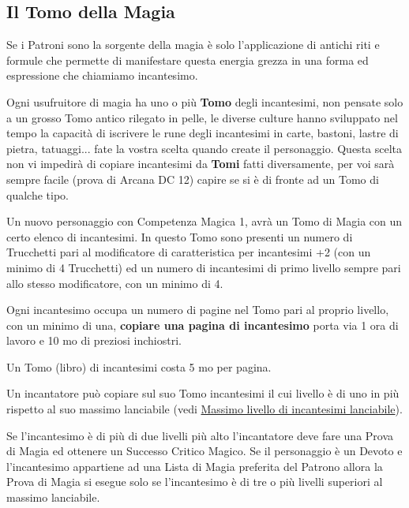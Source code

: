 \begin{multicols}{2}
\subsection{Il Tomo della Magia}\label{magietomodellamagia}

Se i Patroni sono la sorgente della magia è solo l'applicazione di antichi riti e formule che permette di manifestare questa energia grezza in una forma ed espressione che chiamiamo incantesimo.

Ogni usufruitore di magia ha uno o più \textbf{Tomo} degli incantesimi, non pensate solo a un grosso Tomo antico rilegato in pelle, le diverse culture hanno sviluppato nel tempo la capacità di iscrivere le rune degli incantesimi in carte, bastoni, lastre di pietra, tatuaggi... fate la vostra scelta quando create il personaggio.
Questa scelta non vi impedirà di copiare incantesimi da \textbf{Tomi} fatti diversamente, per voi sarà sempre facile (prova di Arcana DC 12) capire se si è di fronte ad un Tomo di qualche tipo.

Un nuovo personaggio con Competenza Magica 1, avrà un Tomo di Magia con un certo elenco di incantesimi. In questo Tomo sono presenti un numero di Trucchetti pari al modificatore di caratteristica per incantesimi +2 (con un minimo di 4 Trucchetti) ed un numero di incantesimi di primo livello sempre pari allo stesso modificatore, con un minimo di 4.\label{tomocm1}\hypertarget{tomocm1}{}

Ogni incantesimo occupa un numero di pagine nel Tomo pari al proprio livello, con un minimo di una, \textbf{copiare una pagina di incantesimo} porta via 1 ora di lavoro e 10 mo di preziosi inchiostri.

Un Tomo (libro) di incantesimi costa 5 mo per pagina.

Un incantatore può copiare sul suo Tomo incantesimi il cui livello è di uno in più rispetto al suo massimo lanciabile (vedi \hyperlink{scuoleelivelli}{Massimo livello di incantesimi lanciabile}).

Se l'incantesimo è di più di due livelli più alto l'incantatore deve fare una Prova di Magia ed ottenere un Successo Critico Magico. Se il personaggio è un Devoto e l'incantesimo appartiene ad una Lista di Magia preferita del Patrono allora la Prova di Magia si esegue solo se l'incantesimo è di tre o più livelli superiori al massimo lanciabile.


\end{multicols}
